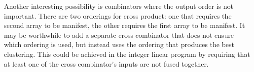 Another interesting possibility is combinators where the output order is not important.
There are two orderings for cross product: one that requires the second array to be manifest, the other requires the first array to be manifest.
It may be worthwhile to add a separate cross combinator that does not ensure which ordering is used, but instead uses the ordering that produces the best clustering.
This could be achieved in the integer linear program by requiring that at least one of the cross combinator's inputs are not fused together.

